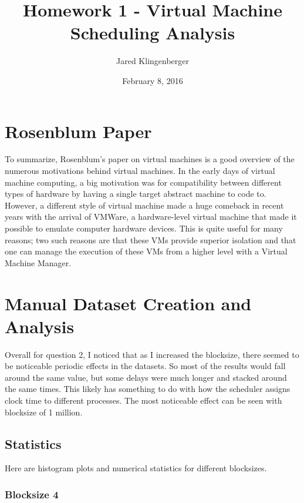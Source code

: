 \documentclass{article}
\title{Homework 1 - Virtual Machine Scheduling Analysis}
\author{Jared Klingenberger}
\date{February 8, 2016}
\begin{document}
\maketitle

\lstlistoflistings

\section{Rosenblum Paper}

To summarize, Rosenblum's paper on virtual machines is a good overview of the
numerous motivations behind virtual machines. In the early days of virtual
machine computing, a big motivation was for compatibility between different
types of hardware by having a single target abstract machine to code to.
However, a different style of virtual machine made a huge comeback in recent
years with the arrival of VMWare, a hardware-level virtual machine that made it
possible to emulate computer hardware devices. This is quite useful for many
reasons; two such reasons are that these VMs provide superior isolation and that
one can manage the execution of these VMs from a higher level with a Virtual
Machine Manager.

\section{Manual Dataset Creation and Analysis}

Overall for question 2, I noticed that as I increased the blocksize, there
seemed to be noticeable periodic effects in the datasets. So most of the results
would fall around the same value, but some delays were much longer and stacked
around the same times. This likely has something to do with how the scheduler
assigns clock time to different processes. The most noticeable effect can be
seen with blocksize of 1 million.

\subsection{Statistics}

Here are histogram plots and numerical statistics for different blocksizes.

\subsubsection{Blocksize 4}
\end{document}
